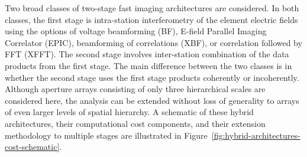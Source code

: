 \documentclass[
  journal=pasa,
  manuscript=article-type,
  year=2020,
  volume=37,
]{cup-journal}
\begin{document}
Two broad classes of two-stage fast imaging architectures are considered. In both classes, the first stage is intra-station interferometry of the element electric fields using the options of voltage beamforming (BF), E-field Parallel Imaging Correlator (EPIC), beamforming of correlations (XBF), or correlation followed by FFT (XFFT). The second stage involves inter-station combination of the data products from the first stage. The main difference between the two classes is in whether the second stage uses the first stage products coherently or incoherently. Although aperture arrays consisting of only three hierarchical scales are considered here, the analysis can be extended without loss of generality to arrays of even larger levels of spatial hierarchy. A schematic of these hybrid architectures, their computational cost components, and their extension methodology to multiple stages are illustrated in Figure~\ref{fig:hybrid-architectures-cost-schematic}.
\end{document}
